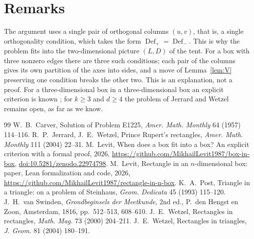 \documentclass[11pt]{article}
\theoremstyle{definition}
\theoremstyle{remark}
\newcommand{\Def}{\operatorname{Def}}
\begin{document}
\section{Remarks}\label{sec:remarks}

The argument uses a single pair of orthogonal columns $(u,v)$, that is, a single orthogonality condition, which
takes the form $\Def_+=\Def_-$. This is why the problem fits into the two-dimensional picture $(L,D)$ of the tent.
For a box with three nonzero edges there are three such conditions; each pair of the columns gives its own
partition of the axes into sides, and a move of Lemma~\ref{lem:V} preserving one condition breaks the other two.
This is an explanation, not a proof. For a three-dimensional box in a three-dimensional box an explicit criterion
is known \cite{Levit2026}; for $k\ge3$ and $d\ge4$ the problem of Jerrard and Wetzel remains open, as far as we know.

\begin{thebibliography}{99}
 W.~B.~Carver, Solution of Problem E1225, \emph{Amer. Math. Monthly} 64 (1957) 114--116.
 R.~P.~Jerrard, J.~E.~Wetzel, Prince Rupert's rectangles, \emph{Amer. Math. Monthly} 111 (2004) 22--31.
 M.~Levit, When does a box fit into a box? An explicit criterion with a formal proof, 2026,
\url{https://github.com/MikhailLevit1987/box-in-box}, \href{https://doi.org/10.5281/zenodo.22974798}{doi:10.5281/zenodo.22974798}.
 M.~Levit, Rectangle in an $n$-dimensional box: paper, Lean formalization and code, 2026,
\url{https://github.com/MikhailLevit1987/rectangle-in-n-box}.
 K.~A.~Post, Triangle in a triangle: on a problem of Steinhaus, \emph{Geom. Dedicata} 45 (1993) 115--120.
 J.~H.~van Swinden, \emph{Grondbeginsels der Meetkunde}, 2nd ed., P.~den Hengst en Zoon, Amsterdam, 1816, pp.~512--513, 608--610.
 J.~E.~Wetzel, Rectangles in rectangles, \emph{Math. Mag.} 73 (2000) 204--211.
 J.~E.~Wetzel, Rectangles in triangles, \emph{J. Geom.} 81 (2004) 180--191.
\end{thebibliography}
\end{document}
